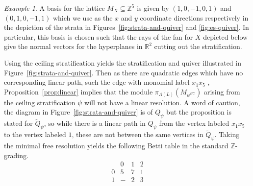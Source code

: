 \documentclass{amsart}
\newcommand{\ZZ}{\mathbb{Z}}
\newcommand{\RR}{\mathbb{R}}
\theoremstyle{remark}
\newtheorem{example}[theorem]{Example}
\begin{document}
\begin{example}
  A basis for the lattice $M_X\subseteq \ZZ^5$ is given by $(1,0,-1,0,1)$ and $(0,1,0,-1,1)$ which we use as the $x$ and $y$ coordinate directions respectively in the depiction of the strata in Figures~\ref{fig:strata-and-quiver} and \ref{fig:es-quiver}. In particular, this basis is chosen such that the rays of the fan for $X$ depicted below give the normal vectors for the hyperplanes in $\RR^2$ cutting out the stratification.
  \begin{center}
  \end{center}
  Using the ceiling stratification yields the stratification and quiver illustrated in Figure~\ref{fig:strata-and-quiver}.
  Then as there are quadratic edges which have no corresponding linear path, such the edge with monomial label $x_1x_5$ , Proposition~\ref{prop:linear} implies that the module $\pi_{\Lambda(L)}(M_{\psi^{BC}})$ arising from the ceiling stratification $\psi$ will not have a linear resolution. A word of caution, the diagram in Figure~\ref{fig:strata-and-quiver} is of $Q_\psi$ but the proposition is stated for $\widetilde{Q}_\psi$, so while there is a linear path in $Q_\psi$ from the vertex labeled $x_1x_5$ to the vertex labeled $1$, these are not between the same vertices in $\widetilde{Q}_\psi$.
  Taking the minimal free resolution yields the following Betti table in the standard $\ZZ$-grading.
  \[\begin{array}{c|ccc}
     & 0 & 1 & 2\\ \hline
    0 & 5 & 7 & 1  \\
    1 & - & 2 & 3 \\
  \end{array}\]

  \begin{figure}[b]
    \begin{center}
\end{center}
\end{figure}
\end{example}
\end{document}
